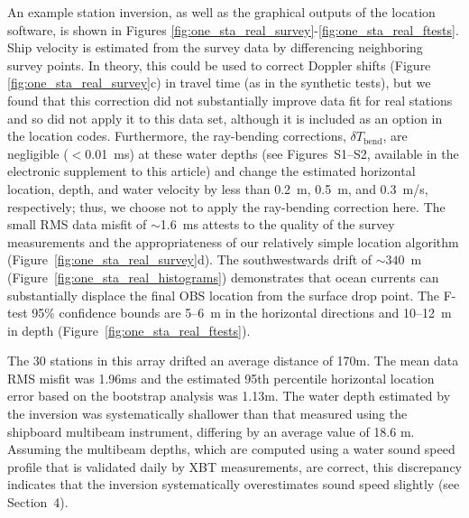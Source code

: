 \documentclass[10pt,titlepage]{article}
\providecommand{\DIFaddtex}[1]{{\protect\color{blue}\uwave{#1}}} %
\providecommand{\DIFaddbegin}{} %
\providecommand{\DIFaddend}{} %
\providecommand{\DIFadd}[1]{\texorpdfstring{\DIFaddtex{#1}}{#1}} %
\begin{document}
An example station inversion, as well as the graphical outputs of the location software, is shown in Figures \ref{fig:one_sta_real_survey}-\ref{fig:one_sta_real_ftests}. Ship velocity is estimated from the survey data by differencing neighboring survey points. In theory, this could be used to correct Doppler shifts (Figure \ref{fig:one_sta_real_survey}c) in travel time (as in the synthetic tests), but we found that this correction did not substantially improve data fit for real stations and so did not apply it to this data set, although it is included as an option in the location codes. Furthermore, the ray-bending corrections, $\delta T_{\text{bend}}$, are negligible ($<$0.01~ms) at these water depths (see Figures~S1--S2, available in the electronic supplement to this article) and change the estimated horizontal location, depth, and water velocity by less than 0.2~m, 0.5~m, and 0.3~m/s, respectively; thus, we choose not to apply the ray-bending correction here. The small RMS data misfit of $\sim$1.6~ms attests to the quality of the survey measurements and the appropriateness of our relatively simple location algorithm (Figure~\ref{fig:one_sta_real_survey}d). The southwestwards drift of \mbox{$\sim340$~m} (Figure~\ref{fig:one_sta_real_histograms}) demonstrates that ocean currents can substantially displace the final OBS location from the surface drop point. The F-test 95\% confidence bounds are 5--6~m in the horizontal directions and 10--12~m in depth (Figure~\ref{fig:one_sta_real_ftests}).

The 30 stations in this array drifted an average distance of 170\DIFaddbegin \DIFadd{~}\DIFaddend m. The mean data RMS misfit was 1.96\DIFaddbegin \DIFadd{~}\DIFaddend ms and the estimated 95th percentile horizontal location error based on the bootstrap analysis was 1.13\DIFaddbegin \DIFadd{~}\DIFaddend m. The water depth estimated by the inversion was systematically shallower than that measured using the shipboard multibeam instrument, differing by an average value of 18.6 m. Assuming the multibeam depths, which are computed using a water sound speed profile that is validated daily by XBT measurements, are correct, this discrepancy indicates that the inversion systematically overestimates sound speed slightly (see Section~4). 
\end{document}
